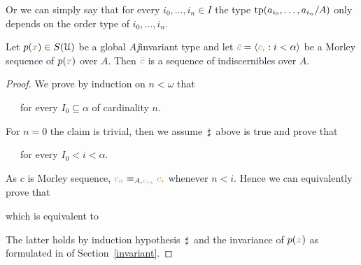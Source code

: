 \documentclass[creche.tex]{subfiles}
\begin{document}
Or we can simply say that for every $i_0,\dots,i_n\in I$ the type ${\rm tp}(a_{i_0},\dots,a_{i_n}/A)$ only depends on the order type of $i_0,\dots,i_n$.

\begin{proposition}
Let $p({\color{brown} x})\in S(\EuScript U)$ be a global $A\jj$invariant type and let ${\color{brown}\bar c}=\langle{\color{brown}c_i}:i<\alpha\rangle$ be a Morley sequence of $p({\color{brown} x})$ over $A$.
Then ${\color{brown}\bar c}$ is a sequence of indiscernibles over $A$.
\end{proposition}

\begin{proof}


We prove by induction on $n<\omega$ that

\ \ \ for every $I_0\subseteq\alpha$ of cardinality $n$.

For $n=0$ the claim is trivial, then we assume $\,\sharp\,$ above is true and prove that

\ \ \ for every $I_0<i<\alpha$.

As $c$ is  Morley sequence, ${\color{brown} c_n}\equiv_{A,{\color{brown} c_{\restriction n}}} {\color{brown} c_i}$ whenever $n<i$.
Hence we can equivalently prove that


which is equivalent to


The latter holds by induction hypothesis $\,\sharp\,$ and the invariance of $p({\color{brown} x})$ as formulated in  of Section~\ref{invariant}.
\end{proof}

\end{document}
